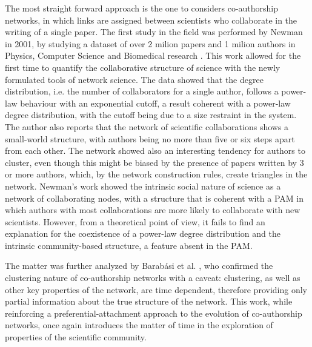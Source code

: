 The most straight forward approach is the one to considers co-authorship networks, in which links are assigned between scientists who collaborate in the writing of a single paper. The first study in the field was performed by Newman in 2001, by studying a dataset of over 2 milion papers and 1 milion authors in Physics, Computer Science and Biomedical research \cite{Newman16012001}.
This work allowed for the first time to quantify the collaborative structure of science with the newly formulated tools of network science. The data showed that the degree distribution, i.e. the number of collaborators
for a single author, follows a power-law behaviour with an exponential cutoff, a result coherent with a power-law degree distribution, with the cutoff being due to a size restraint in the system. The author also reports
that the network of scientific collaborations shows a small-world structure, with authors being no more than five or six steps apart from each other. The network showed also an interesting tendency for authors to cluster,
even though this might be biased by the presence of papers written by 3 or more authors, which, by the network construction rules, create triangles in the network. Newman's work showed the intrinsic social nature of science as a network
of collaborating nodes, with a structure that is coherent with a PAM in which authors with most collaborations are more likely to collaborate with new scientists. However, from
a theoretical point of view, it fails to find an explanation for the coexistence of a  power-law degree distribution and the intrinsic community-based structure, a feature absent in the PAM. 

The matter was further analyzed by Barab{\'a}si et al. \cite{Barabasi2002590}, who confirmed the clustering nature of co-authorship networks with a caveat: clustering, as well as other
 key properties of the network, are time dependent, therefore providing only partial information about the true structure of the network. This work, while reinforcing a preferential-attachment approach to the evolution
 of co-authorship networks, once again introduces the matter of time in the exploration of properties of the scientific community. 
 
